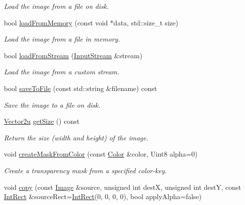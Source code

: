 \begin{DoxyCompactItemize}
\begin{DoxyCompactList}\small\item\em Load the image from a file on disk. \end{DoxyCompactList}\item 
bool \hyperlink{classsf_1_1Image_aaa6c7afa5851a51cec6ab438faa7354c}{load\+From\+Memory} (const void $\ast$data, std\+::size\+\_\+t size)
\begin{DoxyCompactList}\small\item\em Load the image from a file in memory. \end{DoxyCompactList}\item 
bool \hyperlink{classsf_1_1Image_a21122ded0e8368bb06ed3b9acfbfb501}{load\+From\+Stream} (\hyperlink{classsf_1_1InputStream}{Input\+Stream} \&stream)
\begin{DoxyCompactList}\small\item\em Load the image from a custom stream. \end{DoxyCompactList}\item 
bool \hyperlink{classsf_1_1Image_a51537fb667f47cbe80395cfd7f9e72a4}{save\+To\+File} (const std\+::string \&filename) const
\begin{DoxyCompactList}\small\item\em Save the image to a file on disk. \end{DoxyCompactList}\item 
\hyperlink{classsf_1_1Vector2}{Vector2u} \hyperlink{classsf_1_1Image_a85409951b05369813069ed64393391ce}{get\+Size} () const
\begin{DoxyCompactList}\small\item\em Return the size (width and height) of the image. \end{DoxyCompactList}\item 
void \hyperlink{classsf_1_1Image_a22f13f8c242a6b38eb73cc176b37ae34}{create\+Mask\+From\+Color} (const \hyperlink{classsf_1_1Color}{Color} \&color, Uint8 alpha=0)
\begin{DoxyCompactList}\small\item\em Create a transparency mask from a specified color-\/key. \end{DoxyCompactList}\item 
void \hyperlink{classsf_1_1Image_ab2fa337c956f85f93377dcb52153a45a}{copy} (const \hyperlink{classsf_1_1Image}{Image} \&source, unsigned int destX, unsigned int destY, const \hyperlink{classsf_1_1Rect}{Int\+Rect} \&source\+Rect=\hyperlink{classsf_1_1Rect}{Int\+Rect}(0, 0, 0, 0), bool apply\+Alpha=false)

\end{DoxyCompactItemize}
